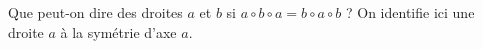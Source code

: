 Que peut-on dire des droites $a$ et $b$ si $a \circ b \circ a = b \circ a \circ b$ ? On identifie ici une droite $a$ à la symétrie d'axe $a$.
